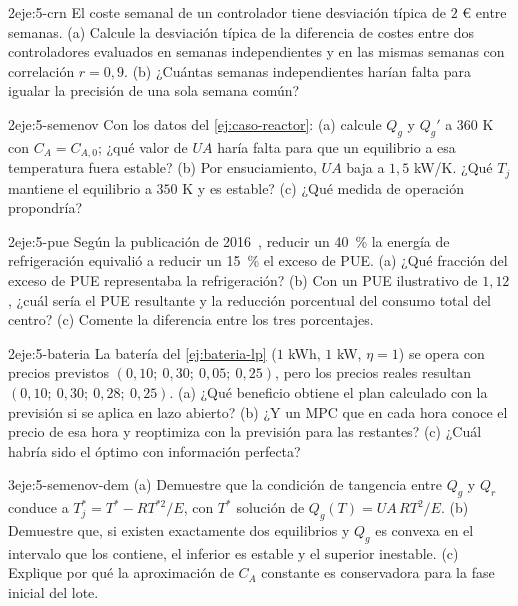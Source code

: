 \begin{ejercicio}{2}{eje:5-crn}
El coste semanal de un controlador tiene desviación típica de $2$ € entre semanas. (a) Calcule la desviación típica de la diferencia de costes entre dos controladores evaluados en semanas independientes y en las mismas semanas con correlación $r=0{,}9$. (b) ¿Cuántas semanas independientes harían falta para igualar la precisión de una sola semana común?
\end{ejercicio}

\begin{ejercicio}{2}{eje:5-semenov}
Con los datos del \cref{ej:caso-reactor}: (a) calcule $Q_g$ y $Q_g'$ a $360$ K con $C_A=C_{A,0}$; ¿qué valor de $UA$ haría falta para que un equilibrio a esa temperatura fuera estable? (b) Por ensuciamiento, $UA$ baja a $1{,}5$ kW/K. ¿Qué $T_j$ mantiene el equilibrio a $350$ K y es estable? (c) ¿Qué medida de operación propondría?
\end{ejercicio}

\begin{ejercicio}{2}{eje:5-pue}
Según la publicación de 2016~\cite{evansgao}, reducir un 40~\% la energía de refrigeración equivalió a reducir un 15~\% el exceso de PUE. (a) ¿Qué fracción del exceso de PUE representaba la refrigeración? (b) Con un PUE ilustrativo de $1{,}12$, ¿cuál sería el PUE resultante y la reducción porcentual del consumo total del centro? (c) Comente la diferencia entre los tres porcentajes.
\end{ejercicio}

\begin{ejercicio}{2}{eje:5-bateria}
La batería del \cref{ej:bateria-lp} ($1$ kWh, $1$ kW, $\eta=1$) se opera con precios previstos $(0{,}10;\ 0{,}30;\ 0{,}05;\ 0{,}25)$, pero los precios reales resultan $(0{,}10;\ 0{,}30;\ 0{,}28;\ 0{,}25)$. (a) ¿Qué beneficio obtiene el plan calculado con la previsión si se aplica en lazo abierto? (b) ¿Y un MPC que en cada hora conoce el precio de esa hora y reoptimiza con la previsión para las restantes? (c) ¿Cuál habría sido el óptimo con información perfecta?
\end{ejercicio}

\begin{ejercicio}{3}{eje:5-semenov-dem}
(a) Demuestre que la condición de tangencia entre $Q_g$ y $Q_r$ conduce a $T_j^{*}=T^{*}-RT^{*2}/E$, con $T^{*}$ solución de $Q_g(T)=UA\,RT^{2}/E$. (b) Demuestre que, si existen exactamente dos equilibrios y $Q_g$ es convexa en el intervalo que los contiene, el inferior es estable y el superior inestable. (c) Explique por qué la aproximación de $C_A$ constante es conservadora para la fase inicial del lote.
\end{ejercicio}

